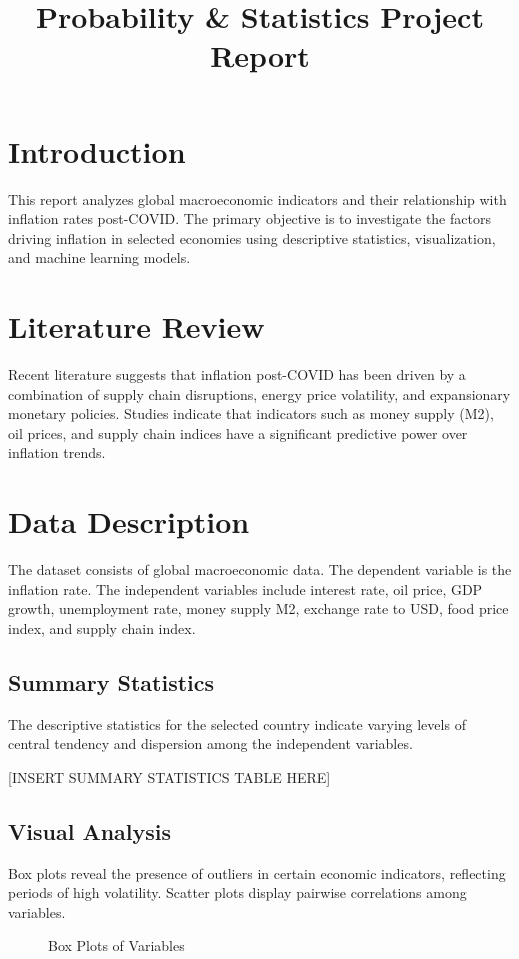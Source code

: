 \documentclass[12pt]{article}
\title{Probability \& Statistics Project Report}
\author{}
\date{}
\begin{document}
\maketitle

\section{Introduction}
This report analyzes global macroeconomic indicators and their relationship with inflation rates post-COVID. The primary objective is to investigate the factors driving inflation in selected economies using descriptive statistics, visualization, and machine learning models.

\section{Literature Review}
Recent literature suggests that inflation post-COVID has been driven by a combination of supply chain disruptions, energy price volatility, and expansionary monetary policies. Studies indicate that indicators such as money supply (M2), oil prices, and supply chain indices have a significant predictive power over inflation trends.

\section{Data Description}
The dataset consists of global macroeconomic data. The dependent variable is the inflation rate. The independent variables include interest rate, oil price, GDP growth, unemployment rate, money supply M2, exchange rate to USD, food price index, and supply chain index. 

\subsection{Summary Statistics}
The descriptive statistics for the selected country indicate varying levels of central tendency and dispersion among the independent variables. 
\begin{table}[H]
\centering
\caption{Summary Statistics}
\vspace{0.2cm}
[INSERT SUMMARY STATISTICS TABLE HERE]
\end{table}

\subsection{Visual Analysis}
Box plots reveal the presence of outliers in certain economic indicators, reflecting periods of high volatility. Scatter plots display pairwise correlations among variables.
\begin{figure}[H]
\caption{Box Plots of Variables}
\end{figure}
\end{document}
